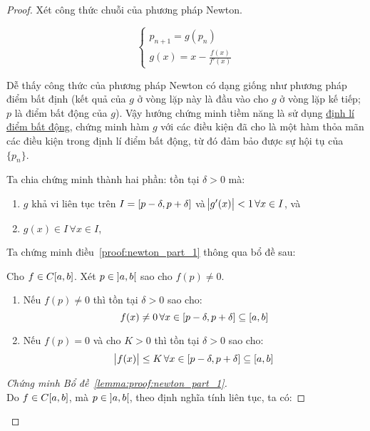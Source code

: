\documentclass[../../Lectures.tex]{subfiles}
\begin{document}
\begin{proof}
    Xét công thức chuỗi của phương pháp Newton.

    \[\begin{cases}
        p_{n + 1} = g(p_n) \\
        g(x) = x - \frac{f(x)}{f'(x)}
    \end{cases}\]

    Dễ thấy công thức của phương pháp Newton có dạng giống như phương pháp điểm
    bất định (kết quả của \(g\) ở vòng lặp này là đầu vào cho \(g\) ở vòng lặp
    kế tiếp; \(p\) là điểm bất động của \(g\)). Vậy hướng chứng minh tiềm năng
    là sử dụng \hyperref[thm:fixed_point]{định lí điểm bất động}, chứng minh hàm
    \(g\) với các điều kiện đã cho là một hàm thỏa mãn các điều kiện trong định
    lí điểm bất động, từ đó đảm bảo được sự hội tụ của \(\{p_n\}\).

    Ta chia chứng minh thành hai phần: tồn tại \(\delta > 0\) mà:

    \begin{enumerate}
        \item \label{proof:newton_part_1} \(g\) khả vi liên tục trên \(I =
            \interval{p - \delta}{p + \delta}\) và \(\abs{g'(x)} < 1 \, \forall
            x \in I\), và
        \item \label{proof:newton_part_2} \(g(x) \in I \, \forall x \in I\),
    \end{enumerate}

    Ta chứng minh điều~\ref{proof:newton_part_1} thông qua bổ đề sau:

    \begin{lemma}\label{lemma:proof:newton_part_1}
        Cho \(f \in C \interval{a}{b}\). Xét \(p \in \interval[open]{a}{b}\) sao
        cho \(f(p) \neq 0\).

        \begin{enumerate}[label = (\alph*)]
            \item Nếu \(f(p) \neq 0\) thì tồn tại \(\delta > 0\) sao cho:
                \[f(x) \neq 0 \, \forall x \in \interval{p - \delta}{p + \delta} \subseteq \interval{a}{b}\]
            \item Nếu \(f(p) = 0\) và cho \(K > 0\) thì tồn tại \(\delta > 0\) sao cho:
                \[\abs{f(x)} \leq K \, \forall x \in \interval{p - \delta}{p + \delta} \subseteq \interval{a}{b}\]
        \end{enumerate}
    \end{lemma}

    \begin{proof}[Chứng minh Bổ đề~\ref{lemma:proof:newton_part_1}]
        $ $\\    %
        Do \(f \in C \interval{a}{b}\), mà \(p \in \interval[open]{a}{b}\), theo
        định nghĩa tính liên tục, ta có:


\end{proof}
\end{proof}
\end{document}
